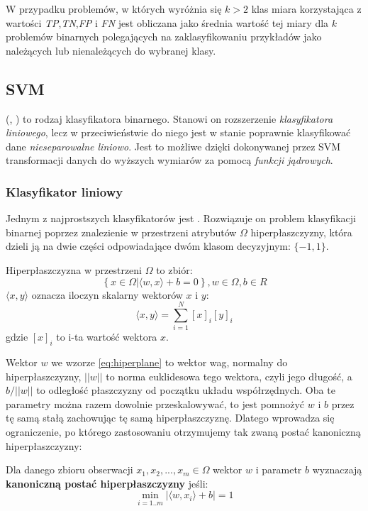 	W przypadku problemów, w których wyróżnia się $ k>2 $ klas miara korzystająca z wartości  \emph{TP},\emph{TN},\emph{FP} i \emph{FN} jest obliczana jako średnia wartość tej miary dla $ k $ problemów binarnych polegających na zaklasyfikowaniu przykładów jako należących lub nienależących do wybranej klasy.


\subsection{SVM}
    
 (, ) to rodzaj klasyfikatora binarnego. Stanowi on rozszerzenie \emph{klasyfikatora liniowego}, lecz w przeciwieństwie do niego jest w stanie poprawnie klasyfikować dane \emph{nieseparowalne liniowo}. Jest to możliwe dzięki dokonywanej przez SVM transformacji danych do wyższych wymiarów za pomocą \emph{funkcji jądrowych}.

\subsubsection{Klasyfikator liniowy}
Jednym z najprostszych klasyfikatorów jest . Rozwiązuje on problem klasyfikacji binarnej poprzez znalezienie w przestrzeni atrybutów $ \Omega $ hiperpłaszczyzny, która dzieli ją na dwie części odpowiadające dwóm klasom decyzyjnym: $ \{-1, 1 \} $.
\begin{definicjaa}
Hiperpłaszczyzna w przestrzeni $ \Omega $ to zbiór:
\begin{equation}
\left\{ x \in \Omega | \langle w, x\rangle + b = 0 \right\}, w \in \Omega, b \in R
\label{eq:hiperplane}
\end{equation}
$ \langle x, y \rangle $ oznacza iloczyn skalarny wektorów $ x $ i $ y $:
$$ \langle x, y \rangle = \sum_{i=1}^{N} [x]_i [y]_i $$
gdzie $ [x]_i $ to i-ta wartość wektora $ x $.
\end{definicjaa}

Wektor $ w $ we wzorze \ref{eq:hiperplane} to wektor wag, normalny do hiperpłaszczyzny, $ ||w|| $ to norma euklidesowa tego wektora, czyli jego długość, a $ b/||w|| $ to odległość płaszczyzny od początku układu współrzędnych.
Oba te parametry można razem dowolnie przeskalowywać, to jest pomnożyć $ w $ i $ b $ przez tę samą stałą zachowując tę samą hiperpłaszczyznę. Dlatego wprowadza się ograniczenie, po którego zastosowaniu otrzymujemy tak zwaną postać kanoniczną hiperpłaszczyzny:
\begin{definicjaa}
Dla danego zbioru obserwacji $ x_1, x_2, ..., x_m \in \Omega $ wektor $ w $ i parametr $ b $ wyznaczają \textbf{kanoniczną postać hiperpłaszczyzny} jeśli:
\begin{equation}
	\min_{i=1..m} | \langle w, x_i \rangle + b | = 1
\label{eq:canonical}
\end{equation}
\end{definicjaa}


